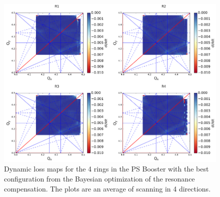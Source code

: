 \begin{figure}[H]
    \centering
    \includegraphics[width=\columnwidth]{chapter5/bocomp.png}
    \caption{Dynamic loss maps for the 4 rings in the PS Booster with the best configuration from the Bayesian optimization of the resonance compensation. The plots are an average of scanning in 4 directions.}
    \label{fig:bocomp_psb}
\end{figure}
